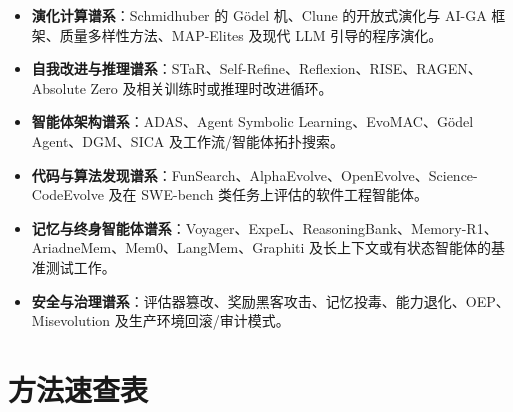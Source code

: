 \begin{itemize}
\item \textbf{演化计算谱系}：Schmidhuber 的 G\"{o}del 机、Clune 的开放式演化与 AI-GA 框架、质量多样性方法、MAP-Elites 及现代 LLM 引导的程序演化。
\item \textbf{自我改进与推理谱系}：STaR、Self-Refine、Reflexion、RISE、RAGEN、Absolute Zero 及相关训练时或推理时改进循环。
\item \textbf{智能体架构谱系}：ADAS、Agent Symbolic Learning、EvoMAC、G\"{o}del Agent、DGM、SICA 及工作流/智能体拓扑搜索。
\item \textbf{代码与算法发现谱系}：FunSearch、AlphaEvolve、OpenEvolve、Science-CodeEvolve 及在 SWE-bench 类任务上评估的软件工程智能体。
\item \textbf{记忆与终身智能体谱系}：Voyager、ExpeL、ReasoningBank、Memory-R1、AriadneMem、Mem0、LangMem、Graphiti 及长上下文或有状态智能体的基准测试工作。
\item \textbf{安全与治理谱系}：评估器篡改、奖励黑客攻击、记忆投毒、能力退化、OEP、Misevolution 及生产环境回滚/审计模式。
\end{itemize}

\section{方法速查表}
\label{app:method-lookup}


